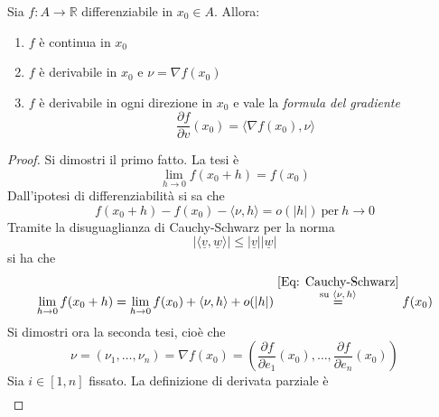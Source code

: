\begin{proposition} \label{Prop: Diff-Der-Cont}
    Sia $f:A \to \mathbb{R}$ differenziabile in $x_0 \in A$. Allora:
    \begin{enumerate}
        \item $f$ è continua in $x_0$
        \item $f$ è derivabile in $x_0$ e $\nu=\nabla f(x_0)$
        \item $f$ è derivabile in ogni direzione in $x_0$ e vale la \textit{formula del gradiente}
            \begin{equation} \label{Eq:Formula gradiente}
                \frac{\partial{f}}{\partial{v}}(x_0)= \langle \nabla f(x_0), \nu\rangle
            \end{equation}
    \end{enumerate}
    \begin{proof}
        Si dimostri il primo fatto. La tesi è
        \begin{equation}
            \lim_{h \to 0}{f(x_0+h)}=f(x_0)
        \end{equation}
        Dall'ipotesi di differenziabilità si sa che
        \begin{equation}
            f(x_0+h)-f(x_0)-\langle \nu, h \rangle = o(|h|)\ \text{per}\ h \to 0
        \end{equation}
        Tramite la disuguaglianza di Cauchy-Schwarz per la norma
        \begin{equation} \label{Eq: Cauchy-Schwarz}
            | \langle \underline{v}, \underline{w} \rangle | \leq |\underline{v}||\underline{w}|
        \end{equation}
        si ha che 
        \begin{equation}
            \lim_{h \to 0}{f(x_0+h)}= \lim_{h \to 0} {f(x_0)+ \langle \nu, h \rangle + o(|h|)}\overset{\substack{\ref{Eq: Cauchy-Schwarz}\\ \text{su $\langle \nu, h \rangle$}}}{=} f(x_0)
        \end{equation}
        Si dimostri ora la seconda tesi, cioè che 
        \begin{equation}
            \nu=(\nu_1, \dots, \nu_n)= \nabla f(x_0) = \left(\frac{\partial{f}}{\partial{e_1}}{(x_0)}, \dots, \frac{\partial{f}}{\partial{e_n}}{(x_0)}\right)
        \end{equation}
        Sia $i \in [1, n]$ fissato. La definizione di derivata parziale è
        \begin{equation}
            \begin{aligned}

\end{aligned}
\end{equation}
\end{proof}
\end{proposition}
